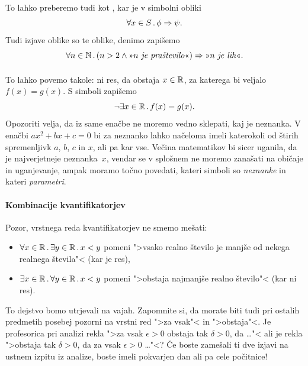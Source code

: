 \paragraph{}
%
To lahko preberemo tudi kot , kar je v simbolni obliki
%
\begin{equation*}
  \forall x \in S \,.\, \phi \Rightarrow \psi.
\end{equation*}
%
Tudi izjave oblike  so te oblike, denimo  zapišemo
%
\begin{equation*}
  \all{n \in \NN} (n > 2 \land \text{\nls{$n$ je praštevilo}}) \lthen \text{\nls{$n$ je lih}}.
\end{equation*}

\paragraph{}
%
To lahko povemo takole: ni res, da obstaja $x \in \mathbb{R}$, za katerega bi
veljalo $f(x) = g(x)$. S simboli zapišemo
%
\begin{equation*}
  \lnot \exists x \in \mathbb{R} \,.\, f(x) = g(x).
\end{equation*}
%
Opozoriti velja, da iz same enačbe ne moremo vedno sklepati, kaj je
neznanka. V enačbi $a x^2 + b x + c = 0$ bi za neznanko lahko načeloma
imeli katerokoli od štirih spremenljivk $a$, $b$, $c$ in $x$, ali pa
kar vse. Večina matematikov bi sicer uganila, da je najverjetneje
neznanka~$x$, vendar se v splošnem ne moremo zanašati na običaje in
uganjevanje, ampak moramo točno povedati, kateri simboli so
\emph{neznanke} in kateri \emph{parametri}.

\paragraph*{Kombinacije kvantifikatorjev}

Pozor, vrstnega reda kvantifikatorjev ne smemo mešati:
%
\begin{itemize}
\item $\forall x \in \mathbb{R} \,.\, \exists y \in \mathbb{R} \,.\, x < y$ pomeni ">vsako realno število je manjše od nekega realnega števila"< (kar je res),
\item $\exists x \in \mathbb{R} \,.\, \forall y \in \mathbb{R} \,.\, x < y$ pomeni ">obstaja najmanjše realno število"< (kar ni res).
\end{itemize}
%
To dejstvo bomo utrjevali na vajah. Zapomnite si, da morate biti tudi pri ostalih predmetih posebej pozorni na vrstni red
">za vsak"< in ">obstaja"<. Je profesorica pri analizi rekla ">za vsak $\epsilon > 0$ obstaja tak $\delta > 0$, da \dots"< ali je rekla ">obstaja tak $\delta > 0$, da za vsak $\epsilon > 0$ \dots"<? Če boste zamešali ti dve izjavi na ustnem izpitu iz analize, boste imeli pokvarjen dan ali pa cele počitnice!


